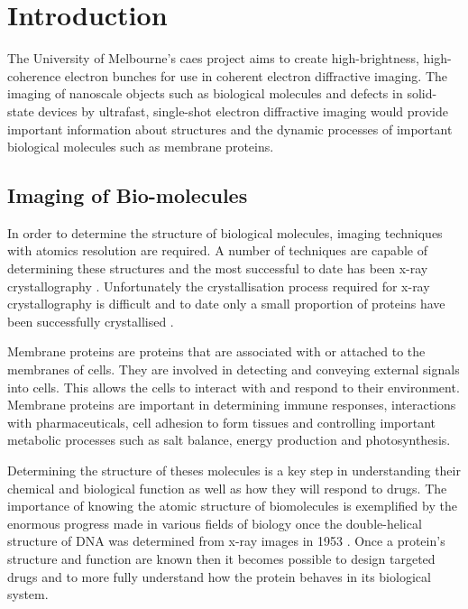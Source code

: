 \chapter{Introduction}

The University of Melbourne's \gls{caes} project aims to create high-brightness,  high-coherence electron bunches for use in coherent electron diffractive imaging. The imaging of nanoscale objects such as biological molecules \cite{dwyer_femtosecond_2006, williamson_clocking_1997} and defects in solid-state devices \cite{siwick_atomic-level_2003} by ultrafast, single-shot electron diffractive imaging would provide important information about structures and the dynamic processes of important biological molecules such as membrane proteins.

\section{Imaging of Bio-molecules}

In order to determine the structure of biological molecules, imaging techniques with atomics resolution are required. A number of techniques are capable of determining these structures \cite{nettleship_methods_2008, svergun_small-angle_2003, opella_structure_2004} and the most successful to date has been x-ray crystallography \cite{kendrew_three-dimensional_1958, uson_advances_1999}. Unfortunately the crystallisation process required for x-ray crystallography is difficult and to date only a small proportion of proteins have been successfully crystallised \cite{geerlof_impact_2006}.

Membrane proteins are proteins that are associated with or attached to the membranes of cells. They are involved in detecting and conveying external signals into cells. This allows the cells to interact with and respond to their environment\cite{almen_mapping_2009}. Membrane proteins are important in determining immune responses, interactions with pharmaceuticals, cell adhesion to form tissues and controlling important metabolic processes such as salt balance, energy production and photosynthesis\cite{chiras_human_2011}.

Determining the structure of theses molecules is a key step in understanding their chemical and biological function as well as how they will respond to drugs. The importance of knowing the atomic structure of biomolecules is exemplified by the enormous progress made in various fields of biology once the double-helical structure of DNA was determined from x-ray images in 1953 \cite{watson_molecular_1953}. Once a protein's structure and function are known then it becomes possible to design targeted drugs \cite{pinto_influenza_1992} and to more fully understand how the protein behaves in its biological system.

